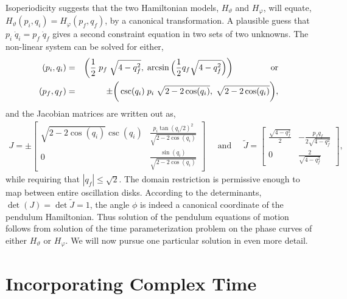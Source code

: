 \documentclass[nofootinbib,preprint]{revtex4-1}
\begin{document}
Isoperiodicity suggests that the two Hamiltonian models, $H_{\vartheta}$ and $H_{\varphi}$, will equate, 
$H_{\vartheta}(p_i,q_i)=H_{\varphi}(p_f,q_f)$, by a canonical transformation. A plausible guess that 
$p_i \;\dot{q}_i = p_f \;\dot{q}_f$ gives a second constraint equation in two sets of two unknowns. 
The non-linear system can be solved for either, 
\begin{eqnarray}
(p_i,q_i) &=& \bigg(\frac{1}{2}\;p_f\;\sqrt{4-q_f^2}, \;
\arcsin\Big(\frac{1}{2}q_f \sqrt{4-q_f^2}\Big)\bigg)
 \text{\;\;\;\;\;\;\;\;\;\;\;\;\;\;\;\;or}  \nonumber \\ 
(p_f,q_f) &=& \pm \bigg(\csc(q_i) \;p_i\; \sqrt{2-2\cos(q_i)}, \; \sqrt{2-2\cos(q_i)} \bigg), \nonumber 
\end{eqnarray}
and the Jacobian matrices are written out as,
\begin{eqnarray}
J = \pm \begin{bmatrix} \sqrt{2-2\cos(q_i)} \csc(q_i) & \frac{p_i \tan(q_i/2)^2}{\sqrt{2-2\cos(q_i)}} \\
0 &  \frac{\sin(q_i)}{\sqrt{2-2\cos(q_i)}}
\end{bmatrix}  \;\;\;\;\; \text{and}  \;\;\;\;\; 
\widetilde{J} = \begin{bmatrix} \frac{\sqrt{4-q_f^2}}{2} & -\frac{p_f q_f}{2\sqrt{4-q_f^2}} \\
0 & \frac{2}{\sqrt{4-q_f^2}} \end{bmatrix}\nonumber,
\end{eqnarray}
while requiring that $|q_f| \le \sqrt{2}$. The domain restriction is permissive enough to map 
between entire oscillation disks. According to the determinants, $\det(J)=\det{\widetilde{J}}=1$,
the angle $\phi$ is indeed a canonical coordinate of the pendulum Hamiltonian. Thus solution of 
the pendulum equations of motion follows from solution of the time parameterization problem on
the phase curves of either $H_{\vartheta}$ or $H_{\varphi}$. We will now pursue one particular 
solution in even more detail.

\section{Incorporating Complex Time}
\end{document}
